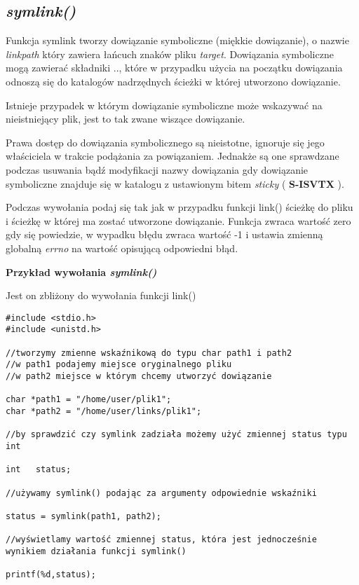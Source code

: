 \documentclass{article}
\begin{document}
\subsection{\textit{symlink()}}

Funkcja symlink tworzy dowiązanie symboliczne (miękkie dowiązanie), o nazwie \textit{linkpath} który zawiera łańcuch znaków pliku \textit{target}. Dowiązania symboliczne mogą zawierać składniki .., które w przypadku użycia na początku dowiązania odnoszą się do katalogów nadrzędnych ścieżki w której utworzono dowiązanie.

Istnieje przypadek w którym dowiązanie symboliczne może wskazywać na nieistniejący plik, jest to tak zwane wiszące dowiązanie.

Prawa dostęp do dowiązania symbolicznego są nieistotne, ignoruje się jego właściciela w trakcie podążania za powiązaniem. Jednakże są one sprawdzane podczas usuwania bądź modyfikacji nazwy dowiązania gdy dowiązanie symboliczne znajduje się w katalogu z ustawionym bitem \textit{sticky} ( \textbf{S-ISVTX} ).

Podczas wywołania podaj się tak jak w przypadku funkcji link() ścieżkę do pliku i ścieżkę w której ma zostać utworzone dowiązanie.
Funkcja zwraca wartość zero gdy się powiedzie, w wypadku błędu zwraca wartość -1 i ustawia zmienną globalną \textit{errno} na wartość opisującą odpowiedni błąd.



\textbf{Przykład wywołania \textit{symlink()}}


Jest on zbliżony do wywołania funkcji link()
\begin{verbatim}
#include <stdio.h>
#include <unistd.h>

//tworzymy zmienne wskaźnikową do typu char path1 i path2
//w path1 podajemy miejsce oryginalnego pliku
//w path2 miejsce w którym chcemy utworzyć dowiązanie

char *path1 = "/home/user/plik1"; 
char *path2 = "/home/user/links/plik1";

//by sprawdzić czy symlink zadziała możemy użyć zmiennej status typu int

int   status; 

//używamy symlink() podając za argumenty odpowiednie wskaźniki

status = symlink(path1, path2);

//wyświetlamy wartość zmiennej status, która jest jednocześnie wynikiem działania funkcji symlink()

printf(%d,status);

\end{verbatim}
\end{document}
